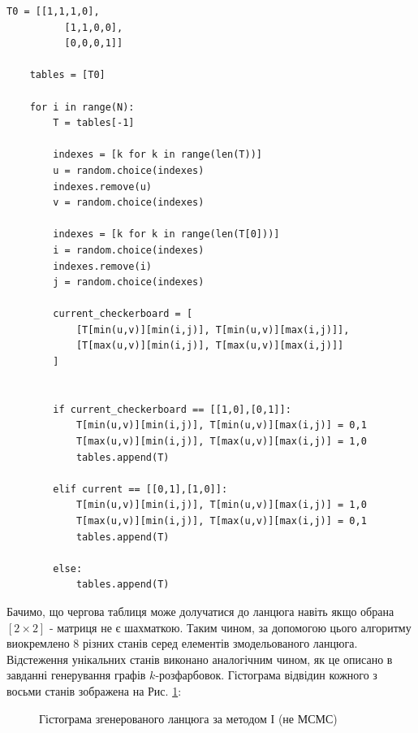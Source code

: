 \documentclass[a4paper,14pt]{extarticle} %
\numberwithin{equation}{section}
\begin{document}
\vspace{0.4cm}
\begin{lstlisting}[firstnumber=1, label = code: task 8.1, caption = Генерування ланцюга Маркова методом І (не МСМС)]
    T0 = [[1,1,1,0],
          [1,1,0,0],
          [0,0,0,1]]

    tables = [T0]
    
    for i in range(N):
        T = tables[-1]

        indexes = [k for k in range(len(T))]
        u = random.choice(indexes)
        indexes.remove(u)
        v = random.choice(indexes)

        indexes = [k for k in range(len(T[0]))]
        i = random.choice(indexes)
        indexes.remove(i)
        j = random.choice(indexes)

        current_checkerboard = [
            [T[min(u,v)][min(i,j)], T[min(u,v)][max(i,j)]],
            [T[max(u,v)][min(i,j)], T[max(u,v)][max(i,j)]]
        ]


        if current_checkerboard == [[1,0],[0,1]]:
            T[min(u,v)][min(i,j)], T[min(u,v)][max(i,j)] = 0,1
            T[max(u,v)][min(i,j)], T[max(u,v)][max(i,j)] = 1,0
            tables.append(T)

        elif current == [[0,1],[1,0]]:
            T[min(u,v)][min(i,j)], T[min(u,v)][max(i,j)] = 1,0
            T[max(u,v)][min(i,j)], T[max(u,v)][max(i,j)] = 0,1
            tables.append(T)
        
        else:
            tables.append(T)
\end{lstlisting}

\vspace{0.4cm}
Бачимо, що чергова таблиця може долучатися до ланцюга навіть якщо обрана $[2\times 2]$ - матриця не є шахматкою. Таким чином, за допомогою цього алгоритму виокремлено 8 різних станів серед елементів змодельованого ланцюга. Відстеження унікальних станів виконано аналогічним чином, як це описано в завданні генерування графів $k$-розфарбовок. Гістограма відвідин кожного з восьми станів зображена на Рис. \ref{figure: task 8.1}:

\vspace{0.4cm}
\begin{figure}[H]
    \caption{Гістограма згенерованого ланцюга за методом І (не МСМС)}
    \label{figure: task 8.1}
\end{figure}
\end{document}
